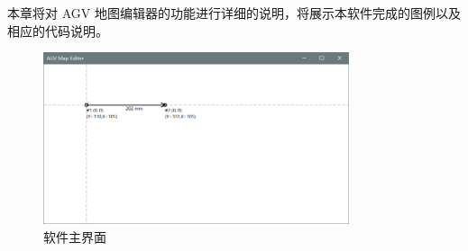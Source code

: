 
本章将对 AGV 地图编辑器的功能进行详细的说明，将展示本软件完成的图例以及相应的代码说明。

\begin{figure}[H]
  \centering
  \includegraphics[width=0.8\textwidth]{assets/mainview.png}
  \caption{软件主界面}
  \label{fig:mainview}
\end{figure}
